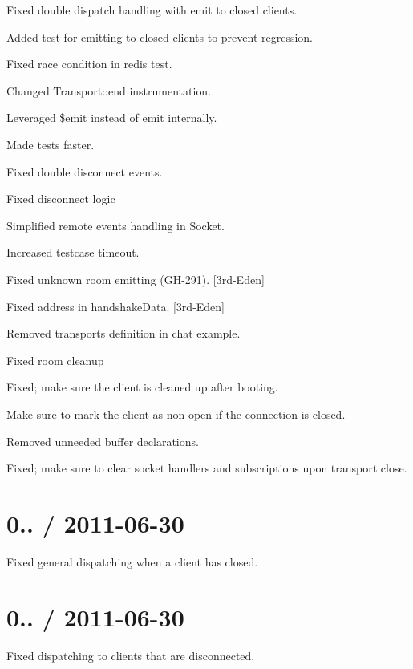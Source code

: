 \begin{DoxyItemize}
\item Fixed double dispatch handling with emit to closed clients.
\item Added test for emitting to closed clients to prevent regression.
\item Fixed race condition in redis test.
\item Changed Transport\+::end instrumentation.
\item Leveraged \$emit instead of emit internally.
\item Made tests faster.
\item Fixed double disconnect events.
\item Fixed disconnect logic
\item Simplified remote events handling in Socket.
\item Increased testcase timeout.
\item Fixed unknown room emitting (G\+H-\/291). \mbox{[}3rd-\/\+Eden\mbox{]}
\item Fixed {\ttfamily address} in handshake\+Data. \mbox{[}3rd-\/\+Eden\mbox{]}
\item Removed transports definition in chat example.
\item Fixed room cleanup
\item Fixed; make sure the client is cleaned up after booting.
\item Make sure to mark the client as non-\/open if the connection is closed.
\item Removed unneeded {\ttfamily buffer} declarations.
\item Fixed; make sure to clear socket handlers and subscriptions upon transport close.
\end{DoxyItemize}

\section*{0.. / 2011-\/06-\/30 }


\begin{DoxyItemize}
\item Fixed general dispatching when a client has closed.
\end{DoxyItemize}

\section*{0.. / 2011-\/06-\/30 }


\begin{DoxyItemize}
\item Fixed dispatching to clients that are disconnected.
\end{DoxyItemize}

